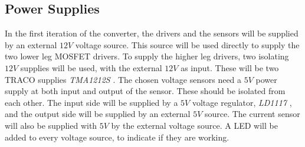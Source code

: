 \subsection{Power Supplies}\label{power_supplies}
In the first iteration of the converter, the drivers and the sensors will be supplied by an external $12V$ voltage source. This source will be used directly to supply the two lower leg MOSFET drivers. To supply the higher leg drivers, two isolating $12V$ supplies will be used, with the external $12V$ as input. These will be two TRACO supplies \textit{TMA1212S} \cite{traco_tma1212}. The chosen voltage sensors need a $5V$ power supply at both input and output of the sensor. These should be isolated from each other. The input side will be supplied by a $5V$ voltage regulator, \textit{LD1117} \cite{LD1117}, and the output side will be supplied by an external $5V$ source. The current sensor will also be supplied with $5V$ by the external voltage source. A LED will be added to every voltage source, to indicate if they are working.